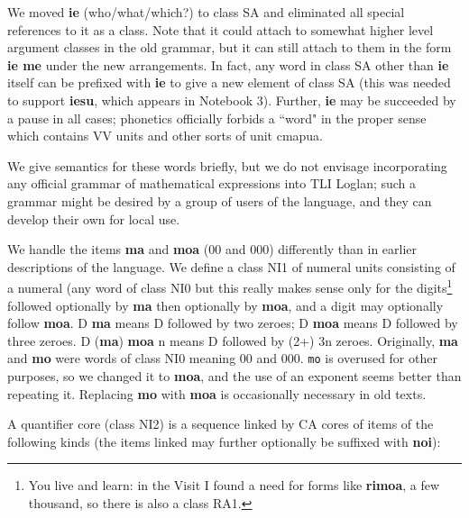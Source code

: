 \documentclass[12pt]{book}
\begin{document}
We moved {\bf ie} (who/what/which?) to class SA and eliminated all special references to it as a class.  Note that it could attach to somewhat higher level argument classes in the old grammar, but it can still attach to them in the form {\bf ie me} under the new arrangements.  In fact, any word in class SA other than {\bf ie} itself can be prefixed with {\bf ie} to give a new element of class SA (this was needed to support {\bf iesu}, which appears in Notebook 3).  Further, {\bf ie} may be succeeded by a pause in all cases;  phonetics officially forbids a ``word" in the proper sense which
contains VV units and other sorts of unit cmapua.

We give semantics for these words briefly, but we do not envisage incorporating any official grammar of mathematical expressions into TLI Loglan; such a grammar might be desired by a group of users of the language, and they can develop their own for local use.

We handle the items {\bf ma} and {\bf moa} (00 and 000) differently than in earlier descriptions of the language.  We define a class NI1 of numeral units consisting of a numeral (any word of class NI0 but this really makes
sense only for the digits\footnote{You live and learn:  in the Visit I found a need for forms like {\bf rimoa}, a few thousand, so there is also a class RA1.} followed optionally by {\bf ma} then optionally by {\bf moa}, and a digit may optionally follow {\bf moa}.   D {\bf ma} means D followed by two zeroes;  D {\bf moa} means D followed
by three zeroes.   D ({\bf ma}) {\bf moa} n means D followed by (2+) 3n zeroes.   Originally, {\bf ma} and {\bf mo} were words of class NI0 meaning 00 and 000.   {\tt mo} is overused for other purposes, so we changed it to {\bf moa}, and the use of an exponent seems better than repeating it.   Replacing {\bf mo} with {\bf moa} is occasionally necessary in old texts.

A quantifier core (class NI2) is a sequence linked by CA cores of items of the following kinds (the items linked may further optionally be suffixed with {\bf noi}):
\end{document}

